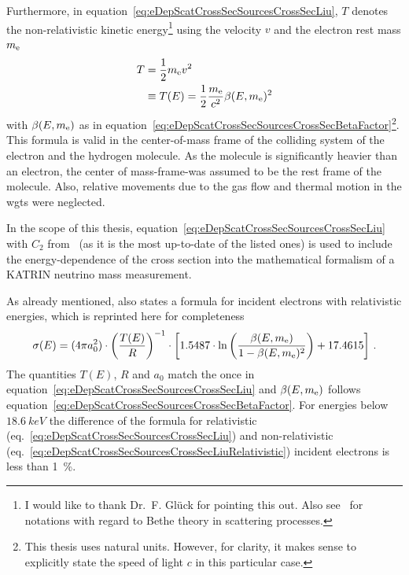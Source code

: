 Furthermore, in equation~\eqref{eq:eDepScatCrossSecSourcesCrossSecLiu}, $T$ denotes the non-relativistic kinetic energy\footnote{I would like to thank Dr.~F. Glück for pointing this out. Also see~\cite{INOKUTI1971} for notations with regard to Bethe theory in scattering processes.} using the velocity $v$ and the electron rest mass $m_{\mathrm{e}}$
\begin{align}
	\label{eq:eDepScatCrossSecSourcesCrossSecNonRelEnergy}
	T  &= \frac{1}{2} m_{\mathrm{e}} v^2 \nonumber \\
	&\equiv T(E) = \frac{1}{2} \frac{m_{\mathrm{e}}}{c^2} \beta(E, m_{\mathrm{e}})^2
\end{align}
with $\beta(E, m_{\mathrm{e}})$ as in equation~\eqref{eq:eDepScatCrossSecSourcesCrossSecBetaFactor}\footnote{This thesis uses natural units. However, for clarity, it makes sense to explicitly state the speed of light $c$ in this particular case.}. This formula is valid in the center-of-mass frame of the colliding system of the electron and the hydrogen molecule. As the molecule is significantly heavier than an electron, the center of mass-frame-was assumed to be the rest frame of the molecule. Also, relative movements due to the gas flow and thermal motion in the \gls{wgts} were neglected.

In the scope of this thesis, equation~\eqref{eq:eDepScatCrossSecSourcesCrossSecLiu} with $C_2$ from~\cite{Liu1987} (as it is the most up-to-date of the listed ones) is used to include the energy-dependence of the cross section into the mathematical formalism of a KATRIN neutrino mass measurement.

As already mentioned, \cite{Liu1973} also states a formula for incident electrons with relativistic energies, which is reprinted here for completeness
\begin{equation}
	\label{eq:eDepScatCrossSecSourcesCrossSecLiuRelativistic}
	\sigma(E) =  
	(4 \pi a_0^2) \cdot
	\left(\frac{T(E)}{R}\right)^{-1} \cdot
	\left[
	1.5487 \cdot \ln{\left(\frac{\beta(E,m_{\mathrm{e}})}{1-\beta(E,m_{\mathrm{e}})^2}\right)} + 17.4615
	\right]
	\text{\,.}
\end{equation}
The quantities $T(E)$, $R$ and $a_0$ match the once in equation~\eqref{eq:eDepScatCrossSecSourcesCrossSecLiu} and $\beta(E, m_{\mathrm{e}})$ follows equation~\eqref{eq:eDepScatCrossSecSourcesCrossSecBetaFactor}. For energies below $\SI{18.6}{keV}$ the difference of the formula for relativistic (eq.~\ref{eq:eDepScatCrossSecSourcesCrossSecLiu}) and non-relativistic (eq.~\ref{eq:eDepScatCrossSecSourcesCrossSecLiuRelativistic}) incident electrons is less than \SI{1}{\percent}.

